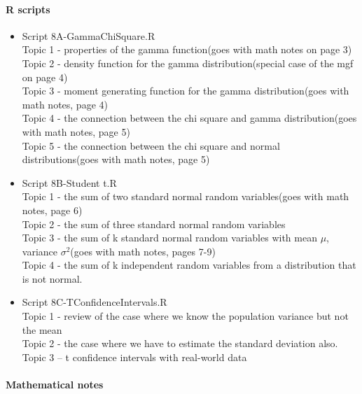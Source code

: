 \documentclass[12pt]{article}
\begin{document}
\paragraph*{R scripts}
\begin{itemize}
\item Script 8A-GammaChiSquare.R\\
Topic 1 - properties of the gamma function(goes with math notes on page 3)\\
Topic 2 - density function for the gamma distribution(special case of the mgf on page 4)\\
Topic 3 - moment generating function for the gamma distribution(goes with math notes, page 4)\\
Topic 4 - the connection between the chi square and gamma distribution(goes with math notes, page 5)\\
Topic 5 - the connection between the chi square and normal distributions(goes with math notes, page 5)\\

\item Script 8B-Student t.R\\
Topic 1 - the sum of two standard normal random variables(goes with math notes, page 6)\\
Topic 2 - the sum of three standard normal random variables\\
Topic 3 - the sum of k standard normal random variables with mean $\mu$, variance $\sigma^2$(goes with math notes, pages 7-9)\\
Topic 4 - the sum of k independent random variables from a distribution that is not normal.\\

\item Script 8C-TConfidenceIntervals.R\\
Topic 1 - review of the case where we know the population variance but not the mean\\
Topic 2 - the case where we have to estimate the standard deviation also.\\
Topic 3 -- t confidence intervals with real-world data



\end{itemize}

\pagebreak





\paragraph*{Mathematical notes}
\end{document}

